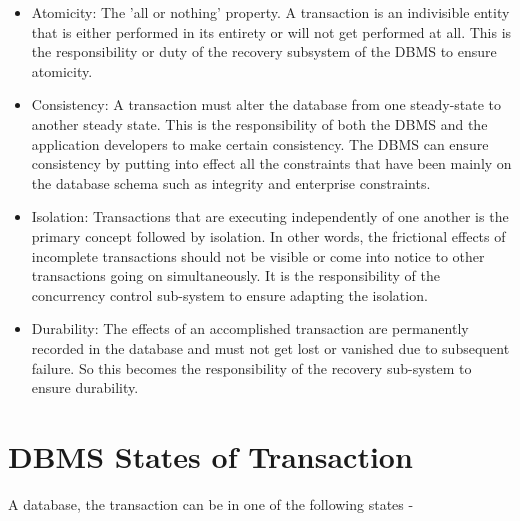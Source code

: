 \documentclass{article}
\begin{document}
\begin{itemize}

\item Atomicity: The 'all or nothing' property. A transaction is an indivisible entity that is either performed in its entirety or will not get performed at all. This is the responsibility or duty of the recovery subsystem of the DBMS to ensure atomicity.

\item Consistency: A transaction must alter the database from one steady-state to another steady state. This is the responsibility of both the DBMS and the application developers to make certain consistency. The DBMS can ensure consistency by putting into effect all the constraints that have been mainly on the database schema such as integrity and enterprise constraints.

\item Isolation: Transactions that are executing independently of one another is the primary concept followed by isolation. In other words, the frictional effects of incomplete transactions should not be visible or come into notice to other transactions going on simultaneously. It is the responsibility of the concurrency control sub-system to ensure adapting the isolation.

\item Durability: The effects of an accomplished transaction are permanently recorded in the database and must not get lost or vanished due to subsequent failure. So this becomes the responsibility of the recovery sub-system to ensure durability.

 \end{itemize}


\section{DBMS States of Transaction}

A database, the transaction can be in one of the following states -
\end{document}
